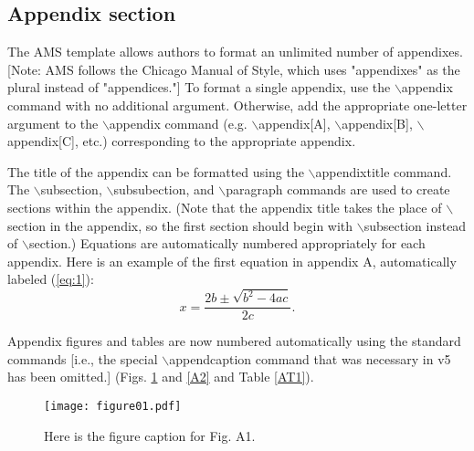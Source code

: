 \documentclass{ametsocV6.1}
\begin{document}


\appendix[A]


\subsection*{Appendix section}

The AMS template allows authors to format an unlimited number of
appendixes. [Note: AMS follows the Chicago Manual of Style, which uses
"appendixes" as the plural instead of "appendices."]
To format a single appendix, use the $\backslash$appendix
command with no additional argument. Otherwise, add the appropriate
one-letter argument to the $\backslash$appendix command (e.g.
$\backslash$appendix[A], $\backslash$appendix[B],
$\backslash$appendix[C], etc.) corresponding to the appropriate
appendix.

The title of the appendix can be formatted using the
$\backslash$appendixtitle{\tt\string{\string}}
 command. The $\backslash$subsection, $\backslash$subsubection,
and $\backslash$paragraph commands are used to create sections within
the appendix. (Note that the appendix title takes the place of $\backslash$section
in the appendix, so the first section should begin with $\backslash$subsection
instead of $\backslash$section.)
 Equations are automatically numbered appropriately for
each appendix. Here is an example of the first equation in appendix
A, automatically labeled (\ref{eq:1}):
\begin{equation} \label{eq:1}
x=\frac{2b\pm\sqrt{b^{2}-4ac}}{2c}.
\end{equation}

Appendix figures and tables are now numbered automatically using the standard commands
[i.e., the special $\backslash$appendcaption command that was necessary in v5 has been omitted.]
(Figs. \ref{A1} and \ref{A2} and Table \ref{AT1}).

\begin{figure}
\center
\texttt{[image: figure01.pdf]}
\caption{Here is the figure caption for Fig. A1.}\label{A1}
\end{figure}
\end{document}
